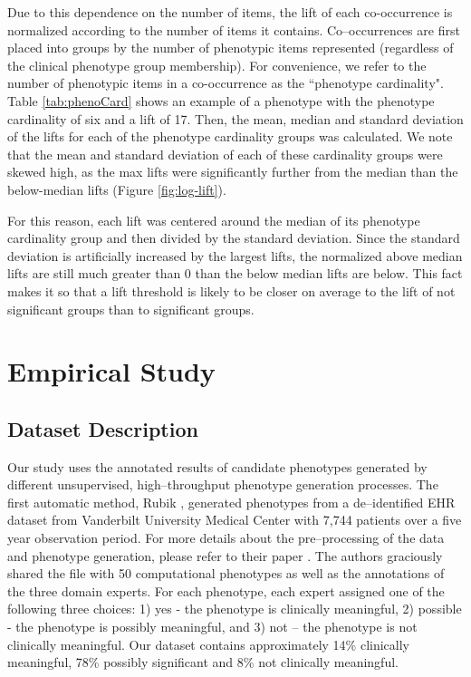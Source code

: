 \documentclass{sig-alternate-05-2015}
\newcommand{\kibitz}[2]{\ifnum\Comments=1\textcolor{#1}{#2}\fi}
\newcommand{\jette}[1]{\kibitz{red}      {[Jette: #1]}}
\begin{document}
Due to this dependence on the number of items, the lift of each co-occurrence is normalized according to the number of items it contains.
Co--occurrences are first placed into groups by the number of phenotypic items represented (regardless of the clinical phenotype group membership).
For convenience, we refer to the number of phenotypic items in a co-occurrence as the ``phenotype cardinality".
Table \ref {tab:phenoCard} shows an example of a phenotype with the phenotype cardinality of six and a lift of 17.
Then, the mean, median and standard deviation of the lifts for each of the phenotype cardinality groups was calculated.
We note that the mean and standard deviation of each of these cardinality groups were skewed high, as the max lifts were significantly further from the median than the below-median lifts (Figure \ref{fig:log-lift}).

For this reason, each lift was centered around the median of its phenotype cardinality group and then divided by the standard deviation.
Since the standard deviation is artificially increased by the largest lifts, the normalized above median lifts are still much greater than 0 than the below median lifts are below. This fact makes it so that a lift threshold is likely to be closer on average to the lift of not significant groups than to significant groups.%


\section{Empirical Study}

\subsection{Dataset Description}
Our study uses the annotated results of candidate phenotypes generated by different unsupervised, high--throughput phenotype generation processes. The first automatic method, Rubik \cite{wang2015rubik},
generated phenotypes from a de--identified EHR dataset from Vanderbilt University Medical Center with 7,744 patients over a five year observation period.
For more details about the pre--processing of the data and phenotype generation, please refer to their paper \cite{wang2015rubik}.
The authors graciously shared the file with 50 computational phenotypes as well as the annotations of the three domain experts.
For each phenotype, each expert assigned one of the following three choices: 1) yes - the phenotype is clinically meaningful, 2) possible - the phenotype is possibly meaningful, and 3) not -- the phenotype is not clinically meaningful.
Our dataset contains approximately 14\% clinically meaningful, 78\% possibly significant and 8\% not clinically meaningful.
\end{document}
